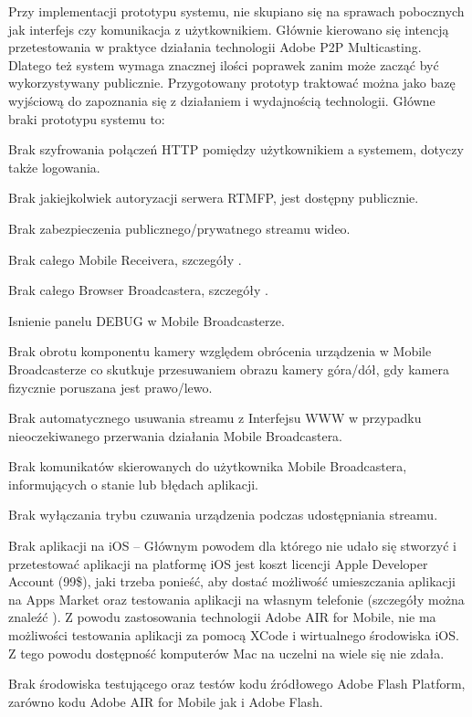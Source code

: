 Przy implementacji prototypu systemu, nie skupiano się na sprawach pobocznych jak interfejs czy komunikacja z użytkownikiem. Głównie kierowano się intencją przetestowania w praktyce działania technologii Adobe P2P Multicasting. Dlatego też system wymaga znacznej ilości poprawek zanim może zacząć być wykorzystywany publicznie. Przygotowany prototyp traktować można jako bazę wyjściową do zapoznania się z działaniem i wydajnością technologii. Główne braki prototypu systemu to:

\begin{packed_item}
    \item{Brak szyfrowania połączeń HTTP pomiędzy użytkownikiem a systemem, dotyczy także logowania.}
    \item{Brak jakiejkolwiek autoryzacji serwera RTMFP, jest dostępny publicznie.}
    \item{Brak zabezpieczenia publicznego/prywatnego streamu wideo.}
    \item{Brak całego Mobile Receivera, szczegóły .}
    \item{Brak całego Browser Broadcastera, szczegóły .}
    \item{Isnienie panelu DEBUG w Mobile Broadcasterze.}
    \item{Brak obrotu komponentu kamery względem obrócenia urządzenia w Mobile Broadcasterze co skutkuje przesuwaniem obrazu kamery góra/dół, gdy kamera fizycznie poruszana jest prawo/lewo.}
    \item{Brak automatycznego usuwania streamu z Interfejsu WWW w przypadku nieoczekiwanego przerwania działania Mobile Broadcastera.}
    \item{Brak komunikatów skierowanych do użytkownika Mobile Broadcastera, informujących o stanie lub błędach aplikacji.}
    \item{Brak wyłączania trybu czuwania urządzenia podczas udostępniania streamu.}
    \item{Brak aplikacji na iOS -- Głównym powodem dla którego nie udało się stworzyć i przetestować aplikacji na platformę iOS jest koszt licencji Apple Developer Account (99\$), jaki trzeba ponieść, aby dostać możliwość umieszczania aplikacji na Apps Market oraz testowania aplikacji na własnym telefonie (szczegóły można znaleźć \cite{UnknAuth11}). Z powodu zastosowania technologii Adobe AIR for Mobile, nie ma możliwości testowania aplikacji za pomocą XCode i wirtualnego środowiska iOS. Z tego powodu dostępność komputerów Mac na uczelni na wiele się nie zdała.}
    \item{Brak środowiska testującego oraz testów kodu źródłowego Adobe Flash Platform, zarówno kodu Adobe AIR for Mobile jak i Adobe Flash.}
\end{packed_item}

